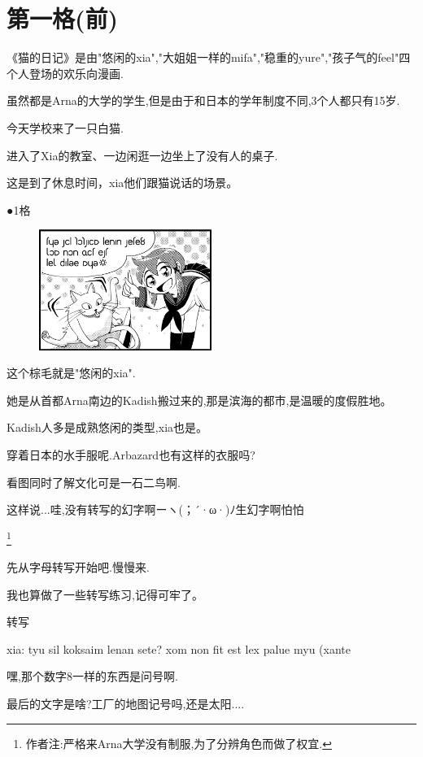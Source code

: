 \chapter{第一格(前)}

《猫的日记》是由"悠闲的xia","大姐姐一样的mifa","稳重的yure","孩子气的feel"四个人登场的欢乐向漫画.

虽然都是Arna的大学的学生,但是由于和日本的学年制度不同,3个人都只有15岁.

今天学校来了一只白猫.

进入了Xia的教室、一边闲逛一边坐上了没有人的桌子.

这是到了休息时间，xia他们跟猫说话的场景。


●1格
\begin{figure}[H]
\includegraphics[width=0.5\textwidth]{ARKA/uni1.png}%
\end{figure}



这个棕毛就是"悠闲的xia".

她是从首都Arna南边的Kadish搬过来的,那是滨海的都市,是温暖的度假胜地。

Kadish人多是成熟悠闲的类型,xia也是。


穿着日本的水手服呢.Arbazard也有这样的衣服吗?

看图同时了解文化可是一石二鸟啊.

这样说...哇,没有转写的幻字啊ーヽ(；´·ω·)ﾉ生幻字啊{\tiny 怕怕}

\footnote{作者注:严格来Arna大学没有制服,为了分辨角色而做了权宜.}

先从字母转写开始吧.慢慢来.

我也算做了一些转写练习,记得可牢了。

\FiveStar 转写

xia: tyu sil koksaim lenan sete? xom non fit est lex palue myu (xante


嘿,那个数字8一样的东西是问号啊.

最后的文字是啥?工厂的地图记号吗,还是太阳....


